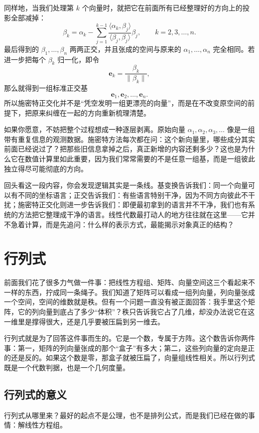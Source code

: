 \documentclass[UTF8]{ctexbook}
\begin{document}
同样地，当我们处理第 $k$ 个向量时，就把它在前面所有已经整理好的方向上的投影全部减掉：
\[
\beta_k=
\alpha_k-
\sum_{j=1}^{k-1}
\frac{\langle \alpha_k,\beta_j\rangle}{\langle \beta_j,\beta_j\rangle}\beta_j,
\qquad k=2,3,\dots,n.
\]
最后得到的 $\beta_1,\dots,\beta_n$ 两两正交，并且张成的空间与原来的 $\alpha_1,\dots,\alpha_n$ 完全相同。若进一步把每个 $\beta_k$ 归一化，即令
\[
\mathbf e_k=\frac{\beta_k}{\|\beta_k\|},
\]
那么就得到一组标准正交基
\[
\mathbf e_1,\mathbf e_2,\dots,\mathbf e_n.
\]
所以施密特正交化并不是“凭空发明一组更漂亮的向量”，而是在不改变原空间的前提下，把原来纠缠在一起的方向重新梳理清楚。

如果你愿意，不妨把整个过程想成一种逐层剥离。原始向量 $\alpha_1,\alpha_2,\alpha_3,\dots$ 像是一组带有重复信息的观测数据。施密特方法每次都在问：这个新向量里，哪些成分其实前面已经说过了？把那些旧信息拿掉之后，真正新增的内容还剩多少？这也是为什么它在数值计算里如此重要，因为我们常常需要的不是任意一组基，而是一组彼此独立得尽可能彻底的方向。


回头看这一段内容，你会发现逻辑其实是一条线。基变换告诉我们：同一个向量可以有不同的坐标语言；正交告诉我们：有些语言特别干净，因为不同方向彼此不干扰；施密特正交化则进一步告诉我们：即便最初拿到的语言并不干净，我们也有系统的方法把它整理成干净的语言。线性代数最打动人的地方往往就在这里——它并不急着计算，而是先追问：什么样的表示方式，最能揭示对象真正的结构？

\newpage

\section{行列式}

前面我们花了很多力气做一件事：把线性方程组、矩阵、向量空间这三个看起来不一样的东西，拧成同一条绳子。我们知道了矩阵可以看成一组列向量，列向量张成一个空间，空间的维数就是秩。但有一个问题一直没有被正面回答：我手里这个矩阵，它的列向量到底占了多少“体积”？秩只告诉我它占了几维，却没办法说它在这一维里是撑得很大，还是几乎要被压扁到另一维去。

行列式就是为了回答这件事而生的。它是一个数，专属于方阵。这个数告诉你两件事：第一，矩阵的列向量张成的那个“盒子”有多大；第二，这些列向量的定向是正的还是反的。如果这个数是零，那盒子就被压扁了，向量组线性相关。所以行列式既是一个代数判据，也是一个几何度量。

\subsection{行列式的意义}

行列式从哪里来？最好的起点不是公理，也不是排列公式，而是我们已经在做的事情：解线性方程组。
\end{document}

